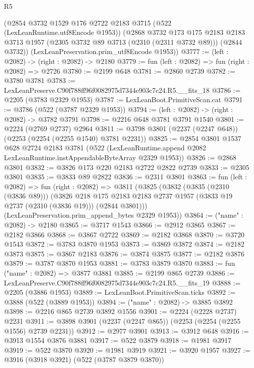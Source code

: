 \begin{lexlean}{R5}
\begin{coremodule}
    (@2854
      @3732
      @1529
      @176
      @2722
      @2183
      @3715
      (@522 (LexLeanRuntime.utf8Encode @1953))
      (@2868
        @3732
        @173
        @175
        @2183
        @2183
        @3713
        @1957
        (@2305 @3732 @89 @3713 (@2310 (@2311 @3732 @89)))
        (@2844 @3732))
      (LexLeanPreservation.prim_utf8Encode @1953))
@3777 := (left : @2082) -> (right : @2082) -> @2180
@3779 := fun (left : @2082) => fun (right : @2082) => @2726
@3780 := @2199 @648
@3781 := @2860 @2739
@3782 := @3780 @3781
@3783 := LexLeanPreserve.C90f788ff96f0082975d7344e903c7c24.R5.__fits_18
@3786 := @2205 (@3783 @2329 @1953)
@3787 := LexLeanBoot.PrimitiveScan.cat
@3791 := @3786 (@522 (@3787 @2329 @1953))
@3794 := (left : @2082) -> (right : @2082) -> @3782 @3791
@3798 := @2216 @648 @3781 @3791 @1540
@3801 := @2224 (@2769 @2737) @2964
@3811 := @3798 @3801 (@2237 (@2247 @648)) (@2253 (@2254 (@2255 @1540) @3781 @2231))
@3825 := @2854
    @3801
    @1537
    @628
    @2724
    @2183
    @3781
    (@522 (LexLeanRuntime.append @2082 LexLeanRuntime.instAppendableByteArray @2329 @1953))
@3826 := @2868 @3801
@3832 := @3826 @173 @220 @2183 @2722 @2822 @2739
@3833 := @2305 @3801
@3835 := @3833 @89 @2822
@3836 := @2311 @3801
@3863 := fun (left : @2082) =>
  fun (right : @2082) =>
  @3811
    (@3825
      (@3832
        (@3835 (@2310 (@3836 @89)))
        (@3826
          @218
          @175
          @2183
          @2183
          @2737
          @1957
          (@3833 @19 @2737 (@2310 (@3836 @19)))
          (@2844 @3801)))
      (LexLeanPreservation.prim_append_bytes @2329 @1953))
@3864 := ("name" : @2082) -> @2180
@3865 := @3717 @1543
@3866 := @2912 @3865
@3867 := @2182 @3866
@3868 := @3867 @2722
@3869 := @2182 @3868
@3870 := @3720 @1543
@3872 := @3783 @3870 @1953
@3873 := @3869 @3872
@3874 := @2182 @3873
@3875 := @3867 @2183
@3876 := @3874 @3875
@3877 := @2182 @3876
@3879 := @3787 @3870 @1953
@3881 := @3783 @3879 @3870
@3883 := fun ("name" : @2082) => @3877 @3881
@3885 := @2199 @865 @2739
@3886 := LexLeanPreserve.C90f788ff96f0082975d7344e903c7c24.R5.__fits_19
@3888 := @2205 (@3886 @1953)
@3889 := LexLeanBoot.PrimitiveScan.ticks
@3892 := @3888 (@522 (@3889 @1953))
@3894 := ("name" : @2082) -> @3885 @3892
@3898 := @2216 @865 @2739 @3892 @1556
@3901 := @2224 (@2228 @2737) @2231
@3911 := @3898 @3901 (@2237 (@2247 @865)) (@2253 (@2254 (@2255 @1556) @2739 @2231))
@3912 := @2977 @3901
@3913 := @3912 @648
@3916 := @3913 @1554 @3876 @3881
@3917 := @522 @3879
@3918 := @1981 @3917
@3919 := @522 @3870
@3920 := @1981 @3919
@3921 := @3920 @1957
@3927 := @3916 (@3918 @3921) (@522 (@3787 @3879 @3870))

\end{coremodule}
\end{lexlean}
